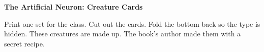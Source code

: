 \documentclass[11pt]{article}
\begin{document}
{\Large\bfseries The Artificial Neuron: Creature Cards}\par\vspace{0.3em}
Print one set for the class. Cut out the cards. Fold the bottom back so the type is hidden. These creatures are made up. The book's author made them with a secret recipe.

\vspace{0.8em}
\noindent{}\hfill{}\hfill{}

\vspace{0.5em}
\noindent{}\hfill{}\hfill{}
\end{document}
